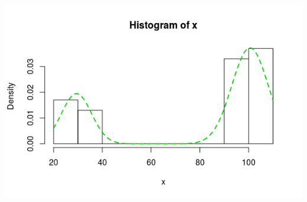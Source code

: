 \documentclass[12pt,a4paper]{report}
\begin{document}
\includegraphics[scale=0.75]{q2_b.png}
\\
\newpage
\end{document}
